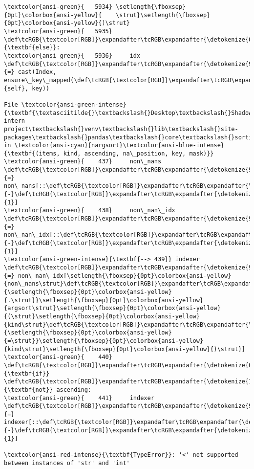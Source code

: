 \documentclass[11pt]{article}
\begin{document}
\begin{Verbatim}[commandchars=\\\{\}, frame=single, framerule=2mm, rulecolor=\color{outerrorbackground}]
\textcolor{ansi-green}{   5934} \setlength{\fboxsep}{0pt}\colorbox{ansi-yellow}{    \strut}\setlength{\fboxsep}{0pt}\colorbox{ansi-yellow}{)\strut}
\textcolor{ansi-green}{   5935} \def\tcRGB{\textcolor[RGB]}\expandafter\tcRGB\expandafter{\detokenize{0,135,0}}{\textbf{else}}:
\textcolor{ansi-green}{   5936}     idx \def\tcRGB{\textcolor[RGB]}\expandafter\tcRGB\expandafter{\detokenize{98,98,98}}{=} cast(Index, ensure\_key\_mapped(\def\tcRGB{\textcolor[RGB]}\expandafter\tcRGB\expandafter{\detokenize{0,135,0}}{self}, key))

File \textcolor{ansi-green-intense}{\textbf{\textasciitilde{}\textbackslash{}Desktop\textbackslash{}Shadowfox intern project\textbackslash{}venv\textbackslash{}lib\textbackslash{}site-packages\textbackslash{}pandas\textbackslash{}core\textbackslash{}sorting.py:439}}, in \textcolor{ansi-cyan}{nargsort}\textcolor{ansi-blue-intense}{\textbf{(items, kind, ascending, na\_position, key, mask)}}
\textcolor{ansi-green}{    437}     non\_nans \def\tcRGB{\textcolor[RGB]}\expandafter\tcRGB\expandafter{\detokenize{98,98,98}}{=} non\_nans[::\def\tcRGB{\textcolor[RGB]}\expandafter\tcRGB\expandafter{\detokenize{98,98,98}}{-}\def\tcRGB{\textcolor[RGB]}\expandafter\tcRGB\expandafter{\detokenize{98,98,98}}{1}]
\textcolor{ansi-green}{    438}     non\_nan\_idx \def\tcRGB{\textcolor[RGB]}\expandafter\tcRGB\expandafter{\detokenize{98,98,98}}{=} non\_nan\_idx[::\def\tcRGB{\textcolor[RGB]}\expandafter\tcRGB\expandafter{\detokenize{98,98,98}}{-}\def\tcRGB{\textcolor[RGB]}\expandafter\tcRGB\expandafter{\detokenize{98,98,98}}{1}]
\textcolor{ansi-green-intense}{\textbf{--> 439}} indexer \def\tcRGB{\textcolor[RGB]}\expandafter\tcRGB\expandafter{\detokenize{98,98,98}}{=} non\_nan\_idx[\setlength{\fboxsep}{0pt}\colorbox{ansi-yellow}{non\_nans\strut}\def\tcRGB{\textcolor[RGB]}\expandafter\tcRGB\expandafter{\detokenize{98,98,98}}{\setlength{\fboxsep}{0pt}\colorbox{ansi-yellow}{.\strut}}\setlength{\fboxsep}{0pt}\colorbox{ansi-yellow}{argsort\strut}\setlength{\fboxsep}{0pt}\colorbox{ansi-yellow}{(\strut}\setlength{\fboxsep}{0pt}\colorbox{ansi-yellow}{kind\strut}\def\tcRGB{\textcolor[RGB]}\expandafter\tcRGB\expandafter{\detokenize{98,98,98}}{\setlength{\fboxsep}{0pt}\colorbox{ansi-yellow}{=\strut}}\setlength{\fboxsep}{0pt}\colorbox{ansi-yellow}{kind\strut}\setlength{\fboxsep}{0pt}\colorbox{ansi-yellow}{)\strut}]
\textcolor{ansi-green}{    440} \def\tcRGB{\textcolor[RGB]}\expandafter\tcRGB\expandafter{\detokenize{0,135,0}}{\textbf{if}} \def\tcRGB{\textcolor[RGB]}\expandafter\tcRGB\expandafter{\detokenize{175,0,255}}{\textbf{not}} ascending:
\textcolor{ansi-green}{    441}     indexer \def\tcRGB{\textcolor[RGB]}\expandafter\tcRGB\expandafter{\detokenize{98,98,98}}{=} indexer[::\def\tcRGB{\textcolor[RGB]}\expandafter\tcRGB\expandafter{\detokenize{98,98,98}}{-}\def\tcRGB{\textcolor[RGB]}\expandafter\tcRGB\expandafter{\detokenize{98,98,98}}{1}]

\textcolor{ansi-red-intense}{\textbf{TypeError}}: '<' not supported between instances of 'str' and 'int'
    \end{Verbatim}
\end{document}
